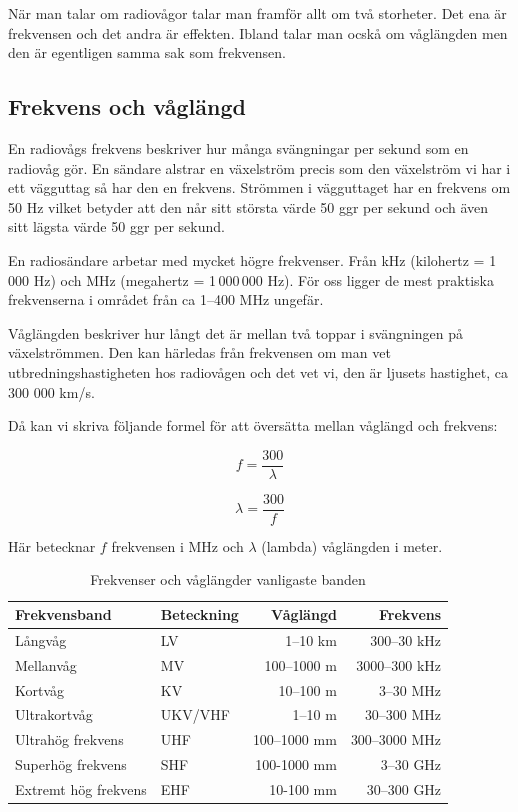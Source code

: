 När man talar om radiovågor talar man framför allt om två storheter. Det ena är frekvensen och det andra är effekten. Ibland talar man ocskå om våglängden men den är egentligen samma sak som frekvensen.

\subsection{Frekvens och våglängd}

En radiovågs frekvens beskriver hur många svängningar per sekund som en radiovåg gör. En sändare alstrar en växelström precis som den växelström vi har i ett vägguttag så har den en frekvens. Strömmen i vägguttaget har en frekvens om 50 Hz vilket betyder att den når sitt största värde 50 ggr per sekund och även sitt lägsta värde 50 ggr per sekund. 

En radiosändare arbetar med mycket högre frekvenser. Från kHz (kilohertz = 1\,000 Hz) och MHz (megahertz = 1\,000\,000 Hz). För oss ligger de mest praktiska frekvenserna i området från ca 1--400 MHz ungefär.

Våglängden beskriver hur långt det är mellan två toppar i svängningen på växelströmmen. Den kan härledas från frekvensen om man vet utbredningshastigheten hos radiovågen och det vet vi, den är ljusets hastighet, ca 300 000 km/s.

Då kan vi skriva följande formel för att översätta mellan våglängd och frekvens:

\begin{equation}
f = \frac{300}{\lambda}
\end{equation}

\begin{equation}
\lambda = \frac{300}{f}
\end{equation}

Här betecknar $f$ frekvensen i MHz och $\lambda$ (lambda) våglängden i meter. 

\begin{table}[!h]
	\begin{tabular}{llrr}
		Frekvensband         & Beteckning &     Våglängd &      Frekvens \\ \hline
		Långvåg              & LV         &     1--10 km &   300--30 kHz \\
		Mellanvåg            & MV         &  100--1000 m & 3000--300 kHz \\
		Kortvåg              & KV         &    10--100 m &     3--30 MHz \\
		Ultrakortvåg         & UKV/VHF    &      1--10 m &   30--300 MHz \\
		Ultrahög frekvens    & UHF        & 100--1000 mm & 300--3000 MHz \\
		Superhög frekvens    & SHF        &  100-1000 mm &     3--30 GHz \\
		Extremt hög frekvens & EHF        &    10-100 mm &   30--300 GHz
	\end{tabular}
	\caption{Frekvenser och våglängder vanligaste banden}
	\label{tab:frekvens-vaglangd}
\end{table}

